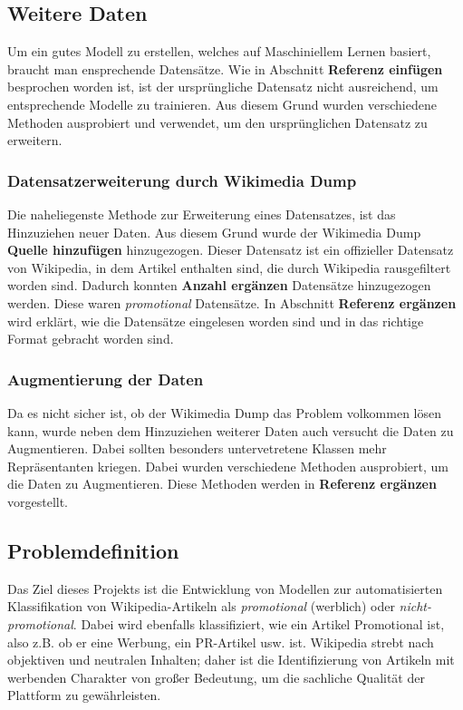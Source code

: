 \documentclass[researchlab,palatino]{AIGpaper}
\begin{document}
\subsection{Weitere Daten}
Um ein gutes Modell zu erstellen, welches auf Maschiniellem Lernen basiert, braucht man ensprechende Datensätze. Wie in Abschnitt \textbf{Referenz einfügen} besprochen worden ist, ist der ursprüngliche Datensatz nicht ausreichend, um entsprechende Modelle zu trainieren. Aus diesem Grund wurden verschiedene Methoden ausprobiert und verwendet, um den ursprünglichen Datensatz zu erweitern.




\subsubsection{Datensatzerweiterung durch Wikimedia Dump}
Die naheliegenste Methode zur Erweiterung eines Datensatzes, ist das Hinzuziehen neuer Daten. Aus diesem Grund wurde der Wikimedia Dump \textbf{Quelle hinzufügen} hinzugezogen. Dieser Datensatz ist ein offizieller Datensatz von Wikipedia, in dem Artikel enthalten sind, die durch Wikipedia rausgefiltert worden sind. Dadurch konnten \textbf{Anzahl ergänzen} Datensätze hinzugezogen werden. Diese waren \textit{promotional} Datensätze. In Abschnitt \textbf{Referenz ergänzen} wird erklärt, wie die Datensätze eingelesen worden sind und in das richtige Format gebracht worden sind.

\subsubsection{Augmentierung der Daten}
Da es nicht sicher ist, ob der Wikimedia Dump das Problem volkommen lösen kann, wurde neben dem Hinzuziehen weiterer Daten auch versucht die Daten zu Augmentieren. Dabei sollten besonders untervetretene Klassen mehr Repräsentanten kriegen. Dabei wurden verschiedene Methoden ausprobiert, um die Daten zu Augmentieren. Diese Methoden werden in \textbf{Referenz ergänzen} vorgestellt.

\subsection{Problemdefinition}
Das Ziel dieses Projekts ist die Entwicklung von Modellen zur automatisierten Klassifikation von Wikipedia-Artikeln als \emph{promotional} (werblich) oder \emph{nicht-promotional}. Dabei wird ebenfalls klassifiziert, wie ein Artikel Promotional ist, also z.B. ob er eine Werbung, ein PR-Artikel usw. ist. Wikipedia strebt nach objektiven und neutralen Inhalten; daher ist die Identifizierung von Artikeln mit werbenden Charakter von großer Bedeutung, um die sachliche Qualität der Plattform zu gewährleisten.
\end{document}
